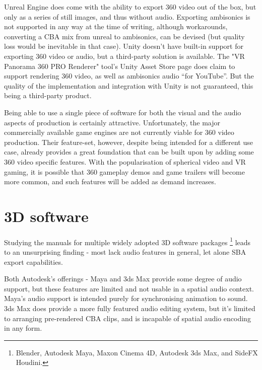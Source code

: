 Unreal Engine does come with the ability to export 360\degree{} video out of the box, but only as a series of still
images, and thus without audio. Exporting ambisonics is not supported in any way at the time of writing, 
although workarounds, converting a CBA mix from unreal to ambisonics, can be devised (but quality loss would be inevitable in that case). \cite{unreal_360_export}
Unity doesn't have built-in support for exporting 360\degree{} video or audio, but a third-party solution 
is available.
The "VR Panorama 360 PRO Renderer" tool's Unity Asset Store page \cite{unity_360_export} does claim to support rendering 
360\degree{} video, as well as ambisonics audio ``for YouTube''. But the quality of the implementation and integration with Unity is not guaranteed,
this being a third-party product.

Being able to use a single piece of software
for both the visual and the audio aspects of production is certainly attractive.
Unfortunately, the major commercially available game engines are not currently viable for 360\degree{} video production.
Their feature-set, however, despite being intended for a different use case, 
already provides a great foundation that can be built upon 
by adding some 360\degree{} video specific features.
With the popularisation of spherical video and VR gaming, it is possible that
360\degree{} gameplay demos and game trailers will become more common, and such features will 
be added as demand increases.

\section{3D software}

Studying the manuals for multiple widely adopted 3D software packages
\footnote{Blender, Autodesk Maya, Maxon Cinema 4D, Autodesk 3ds Max, and SideFX Houdini.}
leads to an unsurprising finding - most lack audio features in general, let alone SBA export capabilities.

Both Autodesk's offerings - Maya and 3ds Max provide some degree of audio support, 
but these features are limited and not usable in a spatial audio context. 
Maya's audio support is intended purely for synchronising animation to sound. \cite{maya_manual_audio}
3ds Max does provide a more fully featured audio editing system, but it's limited to arranging pre-rendered CBA clips, 
and is incapable of spatial audio encoding in any form. \cite{3dsmax_manual_audio}

